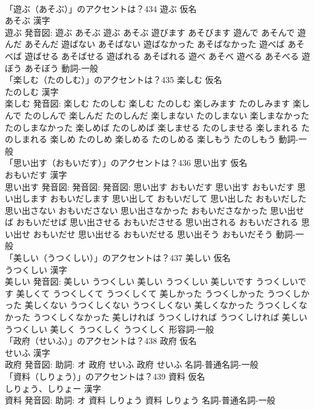 \documentclass[8pt]{extreport}
\begin{document}
\begin{CJK}{UTF8}{min}
\\	「遊ぶ（あそぶ）」のアクセントは？434	遊ぶ 仮名　
\\	あそぶ 漢字　
\\	遊ぶ 発音図:	遊ぶ あそぶ		遊ぶ あそぶ 遊びます あそびます 遊んで あそんで 遊んだ あそんだ 遊ばない あそばない 遊ばなかった あそばなかった 遊べば あそべば 遊ばせる あそばせる 遊ばれる あそばれる 遊べ あそべ 遊べる あそべる 遊ぼう あそぼう				動詞-一般 
\\	「楽しむ（たのしむ）」のアクセントは？435	楽しむ 仮名　
\\	たのしむ 漢字　
\\	楽しむ 発音図:	楽しむ たのしむ		楽しむ たのしむ 楽しみます たのしみます 楽しんで たのしんで 楽しんだ たのしんだ 楽しまない たのしまない 楽しまなかった たのしまなかった 楽しめば たのしめば 楽しませる たのしませる 楽しまれる たのしまれる 楽しめ たのしめ 楽しめる たのしめる 楽しもう たのしもう				動詞-一般 
\\	「思い出す（おもいだす）」のアクセントは？436	思い出す 仮名　
\\	おもいだす 漢字　
\\	思い出す 発音図: 発音図: 発音図:	思い出す おもいだす		思い出す おもいだす 思い出します おもいだします 思い出して おもいだして 思い出した おもいだした 思い出さない おもいださない 思い出さなかった おもいださなかった 思い出せば おもいだせば 思い出させる おもいださせる 思い出される おもいだされる 思い出せ おもいだせ 思い出せる おもいだせる 思い出そう おもいだそう				動詞-一般 
\\	「美しい（うつくしい）」のアクセントは？437	美しい 仮名　
\\	うつくしい 漢字　
\\	美しい 発音図:	美しい うつくしい		美しい うつくしい 美しいです うつくしいです 美しくて うつくしくて うつくしくて 美しかった うつくしかった うつくしかった 美しくない うつくしくない うつくしくない 美しくなかった うつくしくなかった うつくしくなかった 美しければ うつくしければ うつくしければ 美しい うつくしい 美しく うつくしく うつくしく				形容詞-一般 
\\	「政府（せいふ）」のアクセントは？438	政府 仮名　
\\	せいふ 漢字　
\\	政府 発音図: 助詞: オ	政府 せいふ		政府 せいふ				名詞-普通名詞-一般 
\\	「資料（しりょう）」のアクセントは？439	資料 仮名　
\\	しりょう、しりょー 漢字　
\\	資料 発音図: 助詞: オ	資料 しりょう		資料 しりょう				名詞-普通名詞-一般 

\end{CJK}
\end{document}
